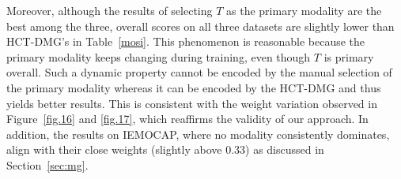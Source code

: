 \documentclass[11pt,a4paper]{article}
\begin{document}
\begin{table}[!ht]
\centering
{}
\vspace{-5pt}
\end{table}

\begin{table}[!ht]
\centering
{}
\end{table}

Moreover, although the results of selecting $T$ as the primary modality are the best among the three, overall scores on all three datasets are slightly lower than HCT-DMG's in Table~\ref{mosi}. This phenomenon is reasonable because the primary modality keeps changing during training, even though $T$ is primary overall. Such a dynamic property cannot be encoded by the manual selection of the primary modality whereas it can be encoded by the HCT-DMG and thus yields better results. This is consistent with the weight variation observed in Figure~\ref{fig.16} and \ref{fig.17}, which reaffirms the validity of our approach. In addition, the results on IEMOCAP, where no modality consistently dominates, align with their close weights (slightly above 0.33) as discussed in Section~\ref{sec:mg}.
\end{document}
